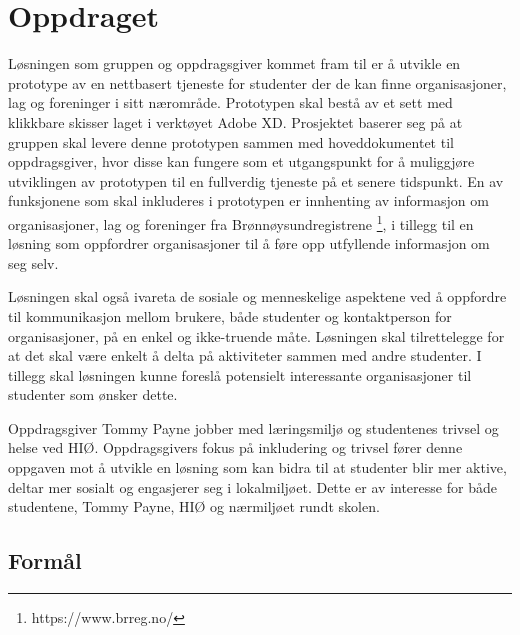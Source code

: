 \section{Oppdraget}
Løsningen som gruppen og oppdragsgiver kommet fram til er å utvikle en prototype av en nettbasert tjeneste for studenter der de kan finne organisasjoner, lag og foreninger i sitt nærområde. Prototypen skal bestå av et sett med klikkbare skisser laget i verktøyet Adobe XD. Prosjektet baserer seg på at gruppen skal levere denne prototypen sammen med hoveddokumentet til oppdragsgiver, hvor disse kan fungere som et utgangspunkt for å muliggjøre utviklingen av prototypen til en fullverdig tjeneste på et senere tidspunkt. En av funksjonene som skal inkluderes i prototypen er innhenting av informasjon om organisasjoner, lag og foreninger fra Brønnøysundregistrene \footnote{https://www.brreg.no/}, i tillegg til en løsning som oppfordrer organisasjoner til å føre opp utfyllende informasjon om seg selv.

Løsningen skal også ivareta de sosiale og menneskelige aspektene ved å oppfordre til kommunikasjon mellom brukere, både studenter og kontaktperson for organisasjoner, på en enkel og ikke-truende måte. Løsningen skal tilrettelegge for at det skal være enkelt å delta på aktiviteter sammen med andre studenter. I tillegg skal løsningen kunne foreslå potensielt interessante organisasjoner til studenter som ønsker dette.

Oppdragsgiver Tommy Payne jobber med læringsmiljø og studentenes trivsel og helse ved HIØ. Oppdragsgivers fokus på inkludering og trivsel fører denne oppgaven mot å utvikle en løsning som kan bidra til at studenter blir mer aktive, deltar mer sosialt og engasjerer seg i lokalmiljøet. Dette er av interesse for både studentene, Tommy Payne, HIØ og nærmiljøet rundt skolen.

\subsection{Formål}
\label{sec:maal-metode-resultater}

